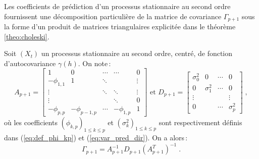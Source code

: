 Les
coefficients de pr\'ediction d'un processus stationnaire au second
ordre fournissent une d\'ecomposition particuli\`ere de la matrice
de covariance $\Gamma_{p+1}$ sous la forme d'un produit de matrices
triangulaires explicit\'ee dans le th\'eor\`eme \ref{theo:choleski}.
\begin{theorem}
 \label{theo:choleski} Soit $(X_t)$ un processus stationnaire au second
ordre, centr\'e, de fonction d'autocovariance $\gamma(h)$. On
note\,:
\[
A_{p+1} = \left[
\begin{matrix}
   1            & 0             & \cdots & \cdots      & 0 \\
   - \phi_{1,1} & 1             & \ddots &             & \vdots \\
   \vdots       &               & \ddots & \ddots      & \vdots \\
   \vdots       &               &        & \ddots      & 0 \\
   - \phi_{p,p} & - \phi_{p-1,p}& \cdots &- \phi_{1,p} &1
\end{matrix}
\right] \text{ et } D_{p+1} = \left[
\begin{matrix}
\sigma^2_0 & 0          & \cdots & 0 \\
0          & \sigma_1^2 & \cdots & 0 \\
\vdots     &            &        & \vdots \\
0          &            & \cdots & \sigma_p^2
\end{matrix}
\right]\;,
\]
o\`u les coefficients $(\phi_{k,p})_{1\leq k\leq p}$ et
$(\sigma_k^2)_{1\leq k\leq p}$ sont respectivement d\'efinis dans
(\ref{eq:def_phi_kp}) et (\ref{eq:var_pred_dir}).
On a alors\,:
\begin{equation}
 \label{eq:decompocholeski}
 \Gamma_{p+1} = A_{p+1}^{-1} D_{p+1} (A_{p+1}^T)^{-1}\;.
\end{equation}
\end{theorem}
